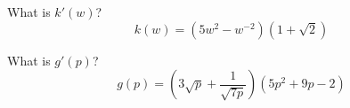 \begin{ProblemSet}[pencil space=2in]
 \begin{Problem}
  What is $k'(w)$?
  \begin{equation*}
   k(w) = \left(5w^2 - w^{-2}\right)\left(1 + \sqrt{2}\right)
  \end{equation*}
 \end{Problem}

 \begin{Problem}
  What is $g'(p)$?
  \begin{equation*}
   g(p) = \left(3\sqrt{p} + \frac{1}{\sqrt{7p}}\right)(5 p^2 + 9 p - 2)
  \end{equation*}
 \end{Problem}

\end{ProblemSet}

